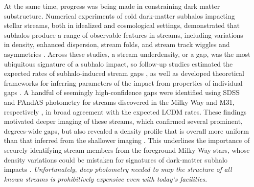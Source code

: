 \documentclass[final,5p,times,twocolumn,authoryear]{elsarticle}
\begin{document}
At the same time, progress was being made in constraining dark matter substructure.
Numerical experiments of cold dark-matter subhalos impacting stellar streams, both in idealized and cosmological settings, demonstrated that subhalos produce a range of observable features in streams, including variations in density, enhanced dispersion, stream folds, and stream track wiggles and asymmetries \citep{carlberg:2009, yoon:2011, ngan:2015, ngan:2016, sandford:2017}.
Across these studies, a stream underdensity, or a gap, was the most ubiquitous signature of a subhalo impact, so follow-up studies estimated the expected rates of subhalo-induced stream gaps \citep{carlberg:2012b, ngan:2014, erkal:2016, banik:2018}, as well as developed theoretical frameworks for inferring parameters of the impact from properties of individual gaps \citep{carlberg:2013b, erkal:2015a, erkal:2015b, helmi:2016, sanders:2016, koppelman:2021}.
A handful of seemingly high-confidence gaps were identified using SDSS and PAndAS photometry for streams discovered in the Milky Way and M31, respectively \citep{carlberg:2011, carlberg:2012, carlberg:2013, carlberg:2016b, carlberg:2016}, in broad agreement with the expected LCDM rates.
These findings motivated deeper imaging of these streams, which confirmed several prominent, degrees-wide gaps, but also revealed a density profile that is overall more uniform than that inferred from the shallower imaging \citep{ibata:2016, erkal:2017, bovy:2017, deboer:2018, bonaca:2020}.
This underlines the importance of securely identifying stream members from the foreground Milky Way stars, whose density variations could be mistaken for signatures of dark-matter subhalo impacts \citep{thomas:2016}.
\emph{Unfortunately, deep photometry needed to map the structure of all known streams is prohibitively expensive even with today's facilities.}
\end{document}
